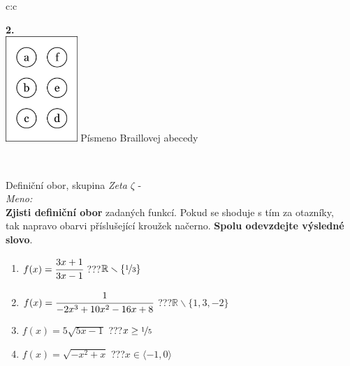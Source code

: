 \documentclass[10pt]{report}
\begin{document}
\begin{tabular}{c:c}
\begin{minipage}[c][99mm][t]{0.49\linewidth}
\begin{center}
\begin{minipage}{0.77\linewidth}
\begin{center}
\begin{varwidth}{\textwidth}
\end{varwidth}
\end{center}
\end{minipage}
\begin{minipage}{0.20\linewidth}
\begin{center}
{\Huge\bfseries 2.} \\[2mm]
\includegraphics[height=40mm]{../images/braille.png}
{\small Písmeno Braillovej abecedy}
\end{center}
\end{minipage}
\end{center}
\end{minipage}
\\ \hdashline
\begin{minipage}[c][99mm][t]{0.49\linewidth}
\begin{center}
\vspace{7mm}
{\huge Definiční obor, skupina \textit{Zeta $\zeta$} -}\\[4.5mm]
\textit{Meno:}\phantom{xxxxxxxxxxxxxxxxxxxxxxxxxxxxxxxxxxxxxxxxxxxxxxxxxxxxxxxxxxxxxxxxx}\\[3.5mm]
\textbf{Zjisti definiční obor} zadaných funkcí. Pokud se shoduje s tím za otazníky,\\tak napravo obarvi příslušející kroužek načerno. \textbf{Spolu odevzdejte výsledné slovo}.\\[3mm]
\begin{minipage}{0.77\linewidth}
\begin{center}
\begin{varwidth}{\textwidth}
\begin{enumerate}
\normalsize
\item $f(x)=\cfrac{3x+1}{3x-1}$\quad \dotfill\; ???\;\dotfill \quad $\mathbb{R}\smallsetminus\{\nicefrac{1}{3}\}$
\item $f(x)=\cfrac{1}{-2x^3+10x^2-16x+8}$\quad \dotfill\; ???\;\dotfill \quad $\mathbb{R}\smallsetminus\{1,3,-2\}$
\item $f(x)=5\sqrt{5x-1}$\quad \dotfill\; ???\;\dotfill \quad $x\geq\nicefrac{1}{5}$
\item $f(x)=\sqrt{-x^2+x}$\quad \dotfill\; ???\;\dotfill \quad $x\in\langle-1 , 0\rangle$

\end{enumerate}
\end{varwidth}
\end{center}
\end{minipage}
\end{center}
\end{minipage}
\end{tabular}
\end{document}
